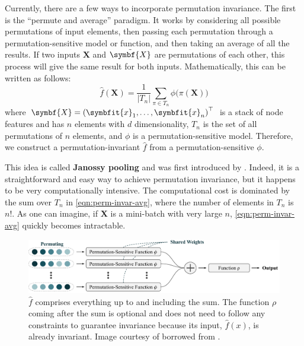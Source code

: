 Currently, there are a few ways to incorporate permutation invariance. The first is the ``permute and average'' paradigm. It works by considering all possible permutations of input elements, then passing each permutation through a permutation-sensitive model or function, and then taking an average of all the results. If two inputs $\symbf{X}$ and $\Tilde{\symbf{X}}$ are permutations of each other, this process will give the same result for both inputs. Mathematically, this can be written as follows:
\begin{equation}
    \label{eqn:perm-invar-avg}
    \widehat{f}(\symbf{X}) = \frac{1}{|{T}_n|} \sum_{\pi \in {T}_n} \phi \bigl( \pi \left( \symbf{X} \right) \bigr)
\end{equation}
where $\symbf{X}=\left(\symbfit{x}_1, \ldots, \symbfit{x}_n\right)^\top$ is a stack of node features and has $n$ elements with $d$ dimensionality, $T_n$ is the set of all permutations of $n$ elements, and $\phi$ is a permutation-sensitive model. Therefore, we construct a permutation-invariant $\widehat{f}$ from a permutation-sensitive $\phi$.

This idea is called \textbf{Janossy pooling} and was first introduced by \textcite{Murphy2018}. Indeed, it is a straightforward and easy way to achieve permutation invariance, but it happens to be very computationally intensive. The computational cost is dominated by the sum over $T_n$ in \cref{eqn:perm-invar-avg}, where the number of elements in $T_n$ is $n!$. As one can imagine, if $\symbf{X}$ is a mini-batch with very large $n$, \cref{eqn:perm-invar-avg} quickly becomes intractable.

\begin{figure}[bh]
    \centering
    \includegraphics[width=\textwidth]{chapters/assets/graph-figs/permuting.pdf}
    \caption{$\widehat{f}$ comprises everything up to and including the sum. The function $\rho$ coming after the sum is optional and does not need to follow any constraints to guarantee invariance because its input, $\widehat{f}(x)$, is already invariant. Image courtesy of borrowed from \textcite{wagstaff2022universal}.}
    \label{fig:basic-perm-invar}
\end{figure}

